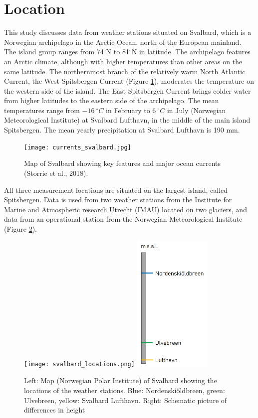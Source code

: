 \documentclass[11pt]{report}
\begin{document}

\section{Location} \label{sec:loc}
This study discusses data from weather stations situated on Svalbard, which is a Norwegian archipelago in the Arctic Ocean, north of the European mainland. The island group ranges from 74$^\circ$N to 81$^\circ$N in latitude. The archipelago features an Arctic climate, although with higher temperatures than other areas on the same latitude.  The northernmost branch of the relatively warm North Atlantic Current, the West Spitsbergen Current (Figure \ref{fig:current}), moderates the temperature on the western side of the island. The East Spitsbergen Current brings colder water from higher latitudes to the eastern side of the archipelago. The mean temperatures range from $\SI{-16}{^\circ C}$ in February to $\SI{6}{^\circ C}$ in July (Norwegian Meteorological Institute) at Svalbard Lufthavn, in the middle of the main island Spitsbergen. The mean yearly precipitation at Svalbard Lufthavn is 190 mm. 
 

\begin{figure}[h]
\texttt{[image: currents\_svalbard.jpg]}
\centering{}
\caption{Map of Svalbard showing key features and major ocean currents (Storrie et al., 2018).}
\label{fig:current}
\end{figure}

All three measurement locations are situated on the largest island, called Spitsbergen. Data is used from two weather stations from the Institute for Marine and Atmospheric research Utrecht (IMAU) located on two glaciers, and data from an operational station from the Norwegian Meteorological Institute (Figure \ref{fig:locations}).

\begin{figure}[h]
\texttt{[image: svalbard\_locations.png]}
\includegraphics[scale=1, width=0.33\textwidth]{height.jpg}
\centering{}
\caption{Left: Map (Norwegian Polar Institute) of Svalbard showing the locations of the weather stations. Blue: Nordenski\H{o}ldbreen, green: Ulvebreen, yellow: Svalbard Lufthavn. Right: Schematic picture of differences in height}
\label{fig:locations}
\end{figure}
\end{document}
